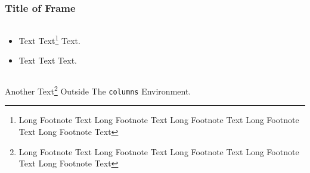 \documentclass[t]{beamer}
\begin{document}
\begin{frame}
%
\frametitle{Title of Frame}
    \begin{columns}[t,onlytextwidth]
        \begin{column}{.5\textwidth}
        \begin{itemize}
        \item Text Text\footnote{Long Footnote Text Long Footnote Text Long Footnote Text Long Footnote Text Long Footnote Text} Text.
        \item Text Text Text.
        \end{itemize}
        \end{column}
        \begin{column}{.5\textwidth}
        \end{column}
    \end{columns}
%
Another Text\footnote{Long Footnote Text Long Footnote Text Long Footnote Text Long Footnote Text Long Footnote Text} Outside The \texttt{columns} Environment.
%
\end{frame}
\end{document}
